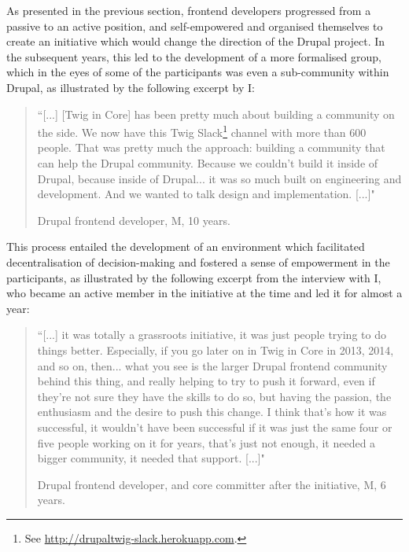 As presented in the previous section, frontend developers progressed from a passive to an active position, and self-empowered and organised themselves to create an initiative which would change the direction of the Drupal project. In the subsequent years, this led to the development of a more formalised group, which in the eyes of some of the participants was even a sub-community within Drupal, as illustrated by the following excerpt by I:

\begin{quotation}
``[...] [Twig in Core] has been pretty much about building a community on the side. We now have this Twig Slack\footnote{See \url{http://drupaltwig-slack.herokuapp.com}.} channel with more than 600 people. That was pretty much the approach: building a community that can help the Drupal community. Because we couldn't build it inside of Drupal, because inside of Drupal... it was so much built on engineering and development. And we wanted to talk design and implementation. [...]"
\begin{flushright}\footnotesize{Drupal frontend developer, M, 10 years.}\end{flushright}
\end{quotation}

This process entailed the development of an environment which facilitated decentralisation of decision-making and fostered a sense of empowerment in the participants, as illustrated by the following excerpt from the interview with I, who became an active member in the initiative at the time and led it for almost a year:

\begin{quotation}
``[...] it was totally a grassroots initiative, it was just people trying to do things better. Especially, if you go later on in Twig in Core in 2013, 2014, and so on, then... what you see is the larger Drupal frontend community behind this thing, and really helping to try to push it forward, even if they're not sure they have the skills to do so, but having the passion, the enthusiasm and the desire to push this change. I think that's how it was successful, it wouldn't have been successful if it was just the same four or five people working on it for years, that's just not enough, it needed a bigger community, it needed that support. [...]"

    \begin{flushright}\footnotesize{Drupal frontend developer, and core committer after the initiative, M, 6 years.}\end{flushright}
    \end{quotation}

